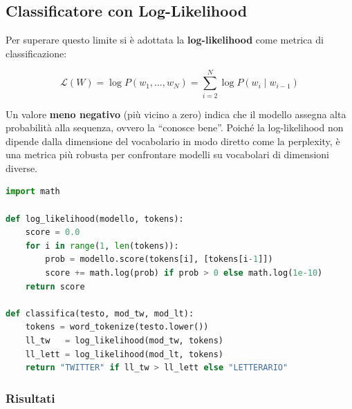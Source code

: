 \documentclass[12pt, a4paper]{article}
\begin{document}
\subsection{Classificatore con Log-Likelihood}

Per superare questo limite si è adottata la \textbf{log-likelihood}
come metrica di classificazione:

\begin{equation}
\mathcal{L}(W) = \log P(w_1, \ldots, w_N)
= \sum_{i=2}^{N} \log P(w_i \mid w_{i-1})
\end{equation}

Un valore \textbf{meno negativo} (più vicino a zero) indica che il
modello assegna alta probabilità alla sequenza, ovvero la ``conosce bene''.
Poiché la log-likelihood non dipende dalla dimensione del vocabolario
in modo diretto come la perplexity, è una metrica più robusta per
confrontare modelli su vocabolari di dimensioni diverse.

\begin{lstlisting}[language=Python, caption=Implementazione del classificatore log-likelihood]
import math

def log_likelihood(modello, tokens):
    score = 0.0
    for i in range(1, len(tokens)):
        prob = modello.score(tokens[i], [tokens[i-1]])
        score += math.log(prob) if prob > 0 else math.log(1e-10)
    return score

def classifica(testo, mod_tw, mod_lt):
    tokens = word_tokenize(testo.lower())
    ll_tw   = log_likelihood(mod_tw, tokens)
    ll_lett = log_likelihood(mod_lt, tokens)
    return "TWITTER" if ll_tw > ll_lett else "LETTERARIO"
\end{lstlisting}

\subsubsection{Risultati}
\end{document}
